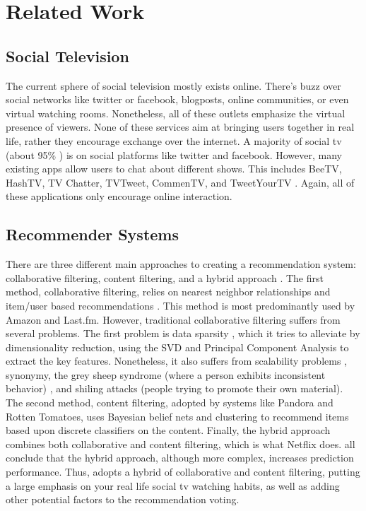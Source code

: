 \section{Related Work}

\subsection{Social Television}
The current sphere of social television mostly exists online.  There’s
buzz over social networks like twitter or facebook, blogposts, online
communities, or even virtual watching rooms.  Nonetheless, all of
these outlets emphasize the virtual presence of viewers.  None of
these services aim at bringing users together in real life, rather
they encourage exchange over the internet.  A majority of social tv
(about 95\% \cite{chausse}) is on social platforms like twitter and
facebook.  However, many existing apps allow users to chat about
different shows.  This includes BeeTV, HashTV, TV Chatter, TVTweet,
CommenTV, and TweetYourTV \cite{chausse}.  Again, all of these
applications only encourage online interaction.

\subsection{Recommender Systems} 
\label{sec:recommender}
There are three different main approaches to creating a recommendation
system: collaborative filtering, content filtering, and a hybrid
approach \cite{Su} \cite{vozalis}.  The first method, collaborative
filtering, relies on nearest neighbor relationships and item/user
based recommendations \cite{su}.  This method is most predominantly
used by Amazon and Last.fm.  However, traditional collaborative
filtering suffers from several problems.  The first problem is data
sparsity \cite{su} \cite{melville}, which it tries to alleviate by
dimensionality reduction, using the SVD and Principal Component
Analysis to extract the key features.  Nonetheless, it also suffers
from scalability problems \cite{papagelis}, synonymy, the grey sheep
syndrome (where a person exhibits inconsistent behavior) \cite{su},
and shiling attacks (people trying to promote their own material).
The second method, content filtering, adopted by systems like Pandora
and Rotten Tomatoes, uses Bayesian belief nets and clustering to
recommend items based upon discrete classifiers on the content.
Finally, the hybrid approach combines both collaborative and content
filtering, which is what Netflix does.  \cite{su} \cite{melville} all
conclude that the hybrid approach, although more complex, increases
prediction performance.  Thus, {\sys} adopts a hybrid of collaborative
and content filtering, putting a large emphasis on your real life
social tv watching habits, as well as adding other potential factors
to the recommendation voting.

